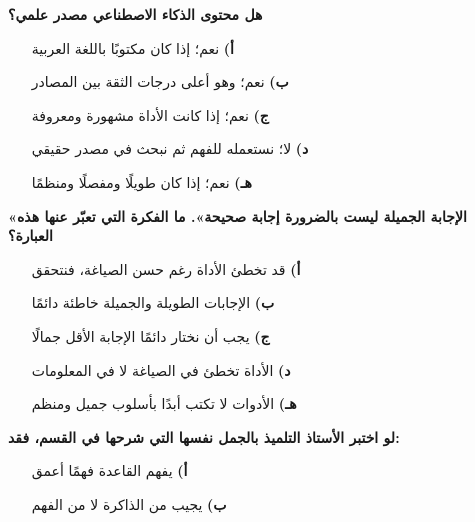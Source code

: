 \documentclass[11pt,a4paper]{article}
\begin{document}
\begin{multicols}{2}
\noindent\begin{minipage}{\linewidth}
\hangindent=0.7cm\textbf{هل محتوى الذكاء الاصطناعي مصدر علمي؟}
\begin{itemize}[leftmargin=0.95cm, labelsep=4pt, itemsep=0pt, topsep=2pt, parsep=0pt]
  \item[\textbf{أ)}] نعم؛ إذا كان مكتوبًا باللغة العربية
  \item[\textbf{ب)}] نعم؛ وهو أعلى درجات الثقة بين المصادر
  \item[\textbf{ج)}] نعم؛ إذا كانت الأداة مشهورة ومعروفة
  \item[\textbf{د)}] لا؛ نستعمله للفهم ثم نبحث في مصدر حقيقي
  \item[\textbf{هـ)}] نعم؛ إذا كان طويلًا ومفصلًا ومنظمًا
\end{itemize}
\end{minipage}\par\vspace{7pt plus 4pt}
\noindent\begin{minipage}{\linewidth}
\hangindent=0.7cm\textbf{«الإجابة الجميلة ليست بالضرورة إجابة صحيحة». ما الفكرة التي تعبّر عنها هذه العبارة؟}
\begin{itemize}[leftmargin=0.95cm, labelsep=4pt, itemsep=0pt, topsep=2pt, parsep=0pt]
  \item[\textbf{أ)}] قد تخطئ الأداة رغم حسن الصياغة، فنتحقق
  \item[\textbf{ب)}] الإجابات الطويلة والجميلة خاطئة دائمًا
  \item[\textbf{ج)}] يجب أن نختار دائمًا الإجابة الأقل جمالًا
  \item[\textbf{د)}] الأداة تخطئ في الصياغة لا في المعلومات
  \item[\textbf{هـ)}] الأدوات لا تكتب أبدًا بأسلوب جميل ومنظم
\end{itemize}
\end{minipage}\par\vspace{7pt plus 4pt}
\noindent\begin{minipage}{\linewidth}
\hangindent=0.7cm\textbf{لو اختبر الأستاذ التلميذ بالجمل نفسها التي شرحها في القسم، فقد:}
\begin{itemize}[leftmargin=0.95cm, labelsep=4pt, itemsep=0pt, topsep=2pt, parsep=0pt]
  \item[\textbf{أ)}] يفهم القاعدة فهمًا أعمق
  \item[\textbf{ب)}] يجيب من الذاكرة لا من الفهم

\end{itemize}
\end{minipage}
\end{multicols}
\end{document}

